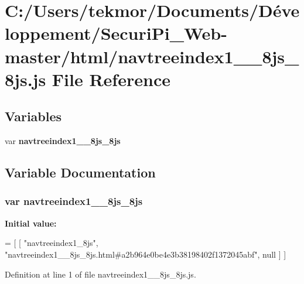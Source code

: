 \section{C\+:/\+Users/tekmor/\+Documents/\+Développement/\+Securi\+Pi\+\_\+\+Web-\/master/html/navtreeindex1\+\_\+\+\_\+8js\+\_\+8js.js File Reference}
\label{navtreeindex1____8js__8js_8js}
\subsection*{Variables}
\begin{DoxyCompactItemize}
\item 
var {\bf navtreeindex1\+\_\+\+\_\+8js\+\_\+8js}
\end{DoxyCompactItemize}


\subsection{Variable Documentation}
\subsubsection[{navtreeindex1\+\_\+\+\_\+8js\+\_\+8js}]{\setlength{\rightskip}{0pt plus 5cm}var navtreeindex1\+\_\+\+\_\+8js\+\_\+8js}\label{navtreeindex1____8js__8js_8js_a6a9f57ec15d1050c84612043d03ed26f}
{\bfseries Initial value\+:}
\begin{DoxyCode}
=
[
    [ \textcolor{stringliteral}{"navtreeindex1\_8js"}, \textcolor{stringliteral}{"navtreeindex1\_\_8js\_8js.html#a2b964e0be4e3b38198402f1372045abf"}, null ]
]
\end{DoxyCode}


Definition at line 1 of file navtreeindex1\+\_\+\+\_\+8js\+\_\+8js.\+js.

